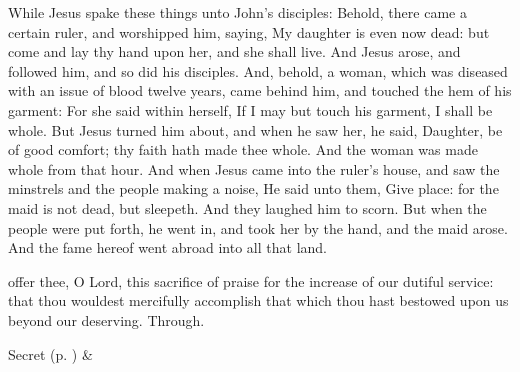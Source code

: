 
\vspace{-0.25\baselineskip}


\vspace{-0.1\baselineskip}

 While Jesus spake these things unto John's disciples: Behold, there came a certain ruler, and worshipped him, saying, My daughter is even now dead: but come and lay thy hand upon her, and she shall live. And Jesus arose, and followed him, and so did his disciples. And, behold, a woman, which was diseased with an issue of blood twelve years, came behind him, and touched the hem of his garment: For she said within herself, If I may but touch his garment, I shall be whole. But Jesus turned him about, and when he saw her, he said, Daughter, be of good comfort; thy faith hath made thee whole. And the woman was made whole from that hour. And when Jesus came into the ruler's house, and saw the minstrels and the people making a noise, He said unto them, Give place: for the maid is not dead, but sleepeth. And they laughed him to scorn. But when the people were put forth, he went in, and took her by the hand, and the maid arose. And the fame hereof went abroad into all that land.


\vspace{-0.25\baselineskip}

\secret

\vspace{-0.1\baselineskip}

 offer thee, O Lord, this sacrifice of praise for the increase of our dutiful service: that thou wouldest mercifully accomplish that which thou hast bestowed upon us beyond our deserving. Through.
\begin{rubric}
     Secret  (p. \pageref{SPSaints}) \&  
\end{rubric}

